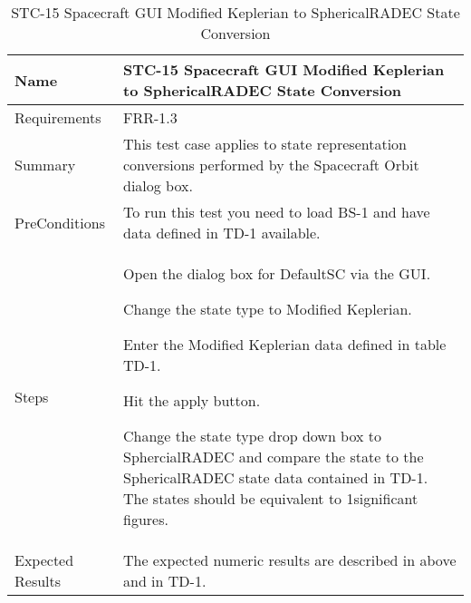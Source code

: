 
\begin{table}[htbp!]
\centering
      \begin{tabular}{|p{1.05 in} |p{4.75 in} |}
      \hline
         \rowcolor[rgb]{0.8,0.8,0.8} Name & STC-15 Spacecraft GUI Modified Keplerian to SphericalRADEC State Conversion\\
         \hline
         Requirements & FRR-1.3\\ \hline
         Summary &
         This test case applies to state representation conversions performed by the Spacecraft Orbit dialog box.  \\
         \hline
         PreConditions & To run this test you need to load BS-1 and have data defined in TD-1 available.\\
         \hline
         Steps &
         \begin{compactenum}
         \item Open the dialog box for DefaultSC via the GUI.
         \item Change the state type to Modified Keplerian.
         \item Enter the Modified Keplerian data defined in table TD-1.
         \item Hit the apply button.
         \item Change the state type drop down box to SphercialRADEC and compare the state to the
         SphericalRADEC state data contained in TD-1. The states should be equivalent to 1significant figures.
         \end{compactenum}\\
         \hline
         Expected Results & The expected numeric results are described in above and in TD-1.\\
      \hline
\end{tabular}
      \label{Table: STC-15}
      \caption{STC-15 Spacecraft GUI Modified Keplerian to SphericalRADEC State Conversion}
\end{table} 